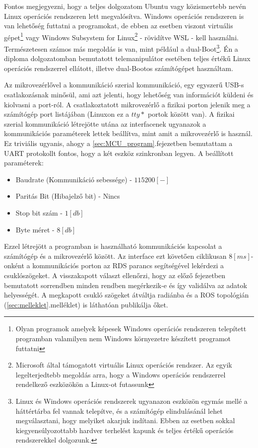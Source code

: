 Fontos megjegyezni, hogy a teljes dolgozatom Ubuntu vagy közismertebb nevén Linux operációs rendszeren lett megvalósítva. Windows operációs rendszeren is van lehetőség futtatni a programokat, de ebben az esetben viszont virtuális gépet\footnote{Olyan programok amelyek képesek Windows operációs rendszeren telepített programban valamilyen nem Windows környezetre készített programot futtatni} vagy Windows Subsystem for Linux\footnote{Microsoft által támogatott virtuális Linux operációs rendszer. Az egyik legelterjedtebb megoldás arra, hogy a Windows operációs rendszerrel rendelkező eszközökön a Linux-ot futassunk} - rövidítve WSL - kell használni. Természetesen számos más megoldás is van, mint például a dual-Boot\footnote{Linux és Windows operációs rendszerek ugyanazon eszközön egymás mellé a háttértárba fel vannak telepítve, és a számítógép elindulásánál lehet megválasztani, hogy melyiket akarjuk indítani. Ebben az esetben sokkal kiegyensúlyozottabb hardver terhelést kapunk és teljes értékű operációs rendszerekkel dolgozunk.}. Én a diploma dolgozatomban bemutatott telemanipulátor esetében teljes értékű Linux operációs rendszerrel ellátott, illetve dual-Bootos számítógépet használtam.

Az mikrovezérlővel a kommunikáció szerial kommunikáció, egy egyszerű USB-s csatlakozásnak minősül, ami azt jelenti, hogy lehetőség van információt küldeni és kiolvasni a port-ról. A csatlakoztatott mikrovezérlő a fizikai porton jelenik meg a számítógép port listájában (Linuxon ez a $tty*$ portok között van). A fizikai szerial kommunikáció létrejötte utána az interfacenek ugyanazok a kommunikációs paraméterek lettek beállítva, mint amit a mikrovezérlő is használ. Ez triviális ugyanis, ahogy a \ref{sec:MCU_program}.fejezetben bemutattam a UART protokollt fontos, hogy a két eszköz szinkronban legyen. A beállított paraméterek:

\begin{itemize}
\item Baudrate (Kommunikáció sebessége) - $115200 [-]$
\item Paritás Bit (Hibajelző bit) - Nincs
\item Stop bit szám - $1 [db]$
\item Byte méret - $8[db]$
\end{itemize}

Ezzel létrejött a programban is használható kommunikációs kapcsolat a számítógép és a mikrovezérlő között. Az interface ezt követően ciklikusan $8[ms]$-onként a kommunikációs porton az RDS parancs segítségével lekérdezi a csuklószögeket. A visszakapott választ ellenőrzi, hogy az előző fejezetben bemutatott sorrendben minden rendben megérkezik-e és így validálva az adatok helyességét. A megkapott csukló szögeket átváltja radiánba és a ROS topológián (\ref{sec:melleklet}.melléklet) is láthatóan publikálja őket.

